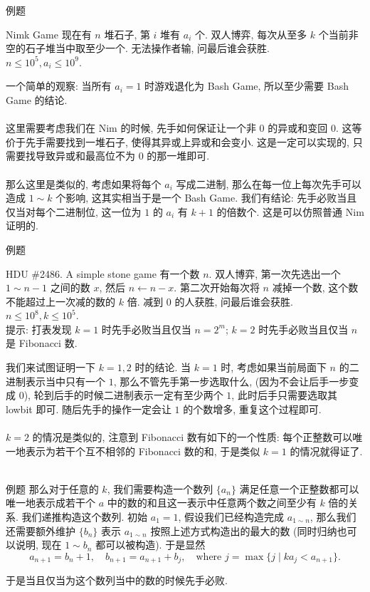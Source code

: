\documentclass{beamer}
\newcommand{\nl}{\\\hspace*{\fill}\\}
\begin{document}
	\begin{frame}{例题}
		\begin{block}{Nimk Game}
			现在有 $n$ 堆石子, 第 $i$ 堆有 $a_i$ 个. 双人博弈, 每次从至多 $k$ 个当前非空的石子堆当中取至少一个. 无法操作者输, 问最后谁会获胜.\\
			$n\leq 10^5,a_i\leq 10^9$.
		\end{block}
		\pause
		一个简单的观察: 当所有 $a_i=1$ 时游戏退化为 Bash Game, 所以至少需要 Bash Game 的结论.\nl
		这里需要考虑我们在 Nim 的时候, 先手如何保证让一个非 $0$ 的异或和变回 $0$. 这等价于先手需要找到一堆石子, 使得其异或上异或和会变小. 这是一定可以实现的, 只需要找导致异或和最高位不为 $0$ 的那一堆即可.\nl
		那么这里是类似的, 考虑如果将每个 $a_i$ 写成二进制, 那么在每一位上每次先手可以造成 $1\sim k$ 个影响, 这其实相当于是一个 Bash Game. 我们有结论: 先手必败当且仅当对每个二进制位, 这一位为 $1$ 的 $a_i$ 有 $k+1$ 的倍数个. 这是可以仿照普通 Nim 证明的.
	\end{frame}

	\begin{frame}{例题}
		\begin{block}{HDU \#2486. A simple stone game}
			有一个数 $n$. 双人博弈, 第一次先选出一个 $1\sim n-1$ 之间的数 $x$, 然后 $n\gets n-x$. 第二次开始每次将 $n$ 减掉一个数, 这个数不能超过上一次减的数的 $k$ 倍. 减到 $0$ 的人获胜, 问最后谁会获胜.\\
			$n\leq 10^8, k\leq 10^5$.\\
			提示: 打表发现 $k=1$ 时先手必败当且仅当 $n=2^m$; $k=2$ 时先手必败当且仅当 $n$ 是 Fibonacci 数.
		\end{block}
		\pause
		我们来试图证明一下 $k=1,2$ 时的结论. 当 $k=1$ 时, 考虑如果当前局面下 $n$ 的二进制表示当中只有一个 $1$, 那么不管先手第一步选取什么, (因为不会让后手一步变成 $0$), 轮到后手的时候二进制表示一定有至少两个 $1$, 此时后手只需要选取其 lowbit 即可. 随后先手的操作一定会让 $1$ 的个数增多, 重复这个过程即可.\nl
		$k=2$ 的情况是类似的, 注意到 Fibonacci 数有如下的一个性质: 每个正整数可以唯一地表示为若干个互不相邻的 Fibonacci 数的和, 于是类似 $k=1$ 的情况就得证了.\nl
	\end{frame}

	\begin{frame}{例题}
		那么对于任意的 $k$, 我们需要构造一个数列 $\{a_n\}$ 满足任意一个正整数都可以唯一地表示成若干个 $a$ 中的数的和且这一表示中任意两个数之间至少有 $k$ 倍的关系. 我们递推构造这个数列. 初始 $a_1=1$, 假设我们已经构造完成 $a_{1\sim n}$, 那么我们还需要额外维护 $\{b_n\}$ 表示 $a_{1\sim n}$ 按照上述方式构造出的最大的数 (同时归纳也可以说明, 现在 $1\sim b_n$ 都可以被构造). 于是显然
		$$
		a_{n+1}=b_n+1,\quad b_{n+1}=a_{n+1}+b_{j},\quad\text{where }j=\max\{j\mid ka_j<a_{n+1}\}.
		$$

		于是当且仅当为这个数列当中的数的时候先手必败.
	\end{frame}
\end{document}

